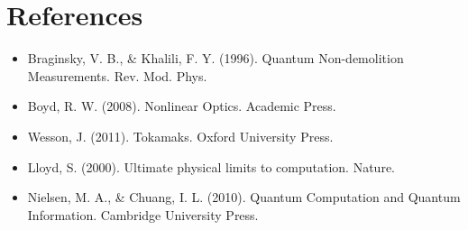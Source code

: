\documentclass[11pt]{article}
\begin{document}
\section*{References}
\begin{itemize}
  \item Braginsky, V. B., \& Khalili, F. Y. (1996). Quantum Non-demolition Measurements. Rev. Mod. Phys.
  \item Boyd, R. W. (2008). Nonlinear Optics. Academic Press.
  \item Wesson, J. (2011). Tokamaks. Oxford University Press.
  \item Lloyd, S. (2000). Ultimate physical limits to computation. Nature.
  \item Nielsen, M. A., \& Chuang, I. L. (2010). Quantum Computation and Quantum Information. Cambridge University Press.
\end{itemize}
\end{document}
